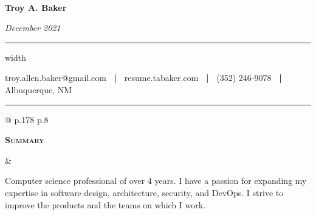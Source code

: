 \documentclass[10pt]{article}
\newcommand{\titlecell}[1]{%
  \begin{minipage}[t]{\linewidth}
    \raggedleft \textbf{#1}
\end{minipage}}
\newcommand{\contentcell}[1]{%
  \begin{minipage}[t]{\linewidth}
    #1
\end{minipage}}
\newcommand{\tablerowskip}{\vspace{1mm} \\}
\newcommand\titleline[4][t]{%
  \par\smallskip\noindent%
  \parbox[#1]{.333\textwidth}{\raggedright#2}%
  \parbox[#1]{.333\textwidth}{\centering#3}%
  \parbox[#1]{.333\textwidth}{\raggedleft#4}\par\smallskip%
}
\begin{document}

\titleline[t]{\ }{\Large \bf Troy A. Baker}{\textsl{December 2021}}
\smallskip
    {\hrule height 1pt width \textwidth}
    \smallskip
    \centerline{troy.allen.baker@gmail.com \textbf{\ |\ } resume.tabaker.com \textbf{\ |\ } (352) 246-9078 \textbf{\ |\ } Albuquerque, NM}
    \smallskip
        {\hrule height 1pt}
        \smallskip\smallskip


        \noindent
        \begin{tabular}{@{} p{.178\textwidth} p{.8\textwidth}}
          \titlecell{\textsc{Summary}} &
          \contentcell{
            Computer science professional of over 4 years. I have a passion for expanding my expertise in software design, architecture, security, and DevOps. I strive to improve the products and the teams on which I work.
          }
        \end{tabular}
        \tablerowskip
\end{document}
